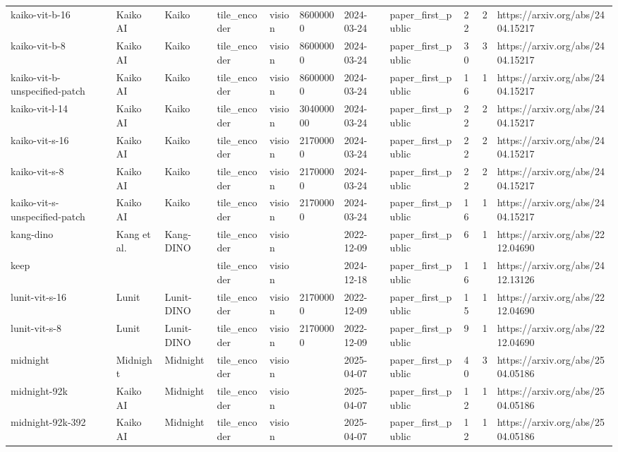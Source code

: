 \begin{longtable}{lllllllllll}
kaiko-vit-b-16 & Kaiko AI & Kaiko & tile\_encoder & vision & 86000000 & 2024-03-24 & paper\_first\_public & 22 & 2 & https://arxiv.org/abs/2404.15217 \\
kaiko-vit-b-8 & Kaiko AI & Kaiko & tile\_encoder & vision & 86000000 & 2024-03-24 & paper\_first\_public & 30 & 3 & https://arxiv.org/abs/2404.15217 \\
kaiko-vit-b-unspecified-patch & Kaiko AI & Kaiko & tile\_encoder & vision & 86000000 & 2024-03-24 & paper\_first\_public & 16 & 1 & https://arxiv.org/abs/2404.15217 \\
kaiko-vit-l-14 & Kaiko AI & Kaiko & tile\_encoder & vision & 304000000 & 2024-03-24 & paper\_first\_public & 22 & 2 & https://arxiv.org/abs/2404.15217 \\
kaiko-vit-s-16 & Kaiko AI & Kaiko & tile\_encoder & vision & 21700000 & 2024-03-24 & paper\_first\_public & 22 & 2 & https://arxiv.org/abs/2404.15217 \\
kaiko-vit-s-8 & Kaiko AI & Kaiko & tile\_encoder & vision & 21700000 & 2024-03-24 & paper\_first\_public & 22 & 2 & https://arxiv.org/abs/2404.15217 \\
kaiko-vit-s-unspecified-patch & Kaiko AI & Kaiko & tile\_encoder & vision & 21700000 & 2024-03-24 & paper\_first\_public & 16 & 1 & https://arxiv.org/abs/2404.15217 \\
kang-dino & Kang et al. & Kang-DINO & tile\_encoder & vision &  & 2022-12-09 & paper\_first\_public & 6 & 1 & https://arxiv.org/abs/2212.04690 \\
keep &  &  & tile\_encoder & vision &  & 2024-12-18 & paper\_first\_public & 16 & 1 & https://arxiv.org/abs/2412.13126 \\
lunit-vit-s-16 & Lunit & Lunit-DINO & tile\_encoder & vision & 21700000 & 2022-12-09 & paper\_first\_public & 15 & 1 & https://arxiv.org/abs/2212.04690 \\
lunit-vit-s-8 & Lunit & Lunit-DINO & tile\_encoder & vision & 21700000 & 2022-12-09 & paper\_first\_public & 9 & 1 & https://arxiv.org/abs/2212.04690 \\
midnight & Midnight & Midnight & tile\_encoder & vision &  & 2025-04-07 & paper\_first\_public & 40 & 3 & https://arxiv.org/abs/2504.05186 \\
midnight-92k & Kaiko AI & Midnight & tile\_encoder & vision &  & 2025-04-07 & paper\_first\_public & 12 & 1 & https://arxiv.org/abs/2504.05186 \\
midnight-92k-392 & Kaiko AI & Midnight & tile\_encoder & vision &  & 2025-04-07 & paper\_first\_public & 12 & 1 & https://arxiv.org/abs/2504.05186 \\

\end{longtable}
